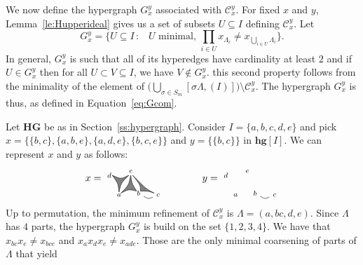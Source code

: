 \documentclass[ALCO,ThmDefs,Unicode,epreuves]{cedram}
\begin{document}
We now define the hypergraph $G_x^y$ associated with $\mathcal{C}_{x}^{y}$. For fixed $x$ and $y$, Lemma~\ref{le:Hupperideal} gives us a set of subsets $U\subseteq I$ defining $\mathcal{C}_{x}^{y}$. Let
 $$G_x^y=\{U\subseteq I \,:\,\text{ $U$ minimal, } \prod_{i\in U} x_{\Lambda_i} \ne x_{\bigcup_{i\in U} \Lambda_i}\} .$$
In general, $G_x^y$ is such that all of its hyperedges have cardinality at least $2$ and if $U\in G_x^y$ then for all $U\subset V\subseteq I$, we have $V\not\in G_x^y$. this second property follows from the minimality of the element of $\big(\bigcup_{\sigma\in S_m} [\sigma\Lambda,(I)]\big)\setminus \mathcal{C}_{x}^{y}$. The hypergraph $G_x^y$ is thus, as defined in Equation~\eqref{eq:Gcom}.





\begin{exam}\label{ex:hypergraph}
Let $\mathbf{HG}$ be as in Section~\ref{ss:hypergraph}. Consider $I= \{a,b,c,d,e\}$ and pick $x=\big\{\{b,c\},\{a,b,e\},\{a,d,e\},\{b,c,e\}\big\}$ and $y=\big\{
\{b,c\}\big\}$ in $\mathbf{hg}[I]$. We can represent $x$ and $y$ as follows:
$$
x=
\begin{tikzpicture}[scale=.7,baseline=.5cm]
	\node (a) at (0,0) {$\scriptstyle a$};
	\node (b) at (1,.1) {$\scriptstyle b$};
	\node (c) at (2,0) {$\scriptstyle c$};
	\node (d) at (-.5,1) {$\scriptstyle d$};
	\node (e) at (.6,1.2) {$\scriptstyle e$};
	\draw [fill=gray] (.1,.1) .. controls (.5,.3) .. (.9,.2) .. controls (.65,.6) .. (.6,1) .. controls (.5,.5) .. (.1,.1) ; 
	\draw [fill=gray] (0,.15) .. controls (-.05,.6) .. (-.35,1) .. controls (.1,.8) .. (.5,1) .. controls (.1,.6) .. (0,.15) ; 
	\draw [fill=gray] (1.8,.1) .. controls (1.5,.2) .. (1.1,.2) .. controls (1.1,.5) .. (.7,1) .. controls (1.4,.3) .. (1.8,.1) ; 
	\draw (b) .. controls (1.5,-.2) .. (c); 
\end{tikzpicture} 
\qquad \qquad
y=
\begin{tikzpicture}[scale=.7,baseline=.5cm]
	\node (a) at (0,0) {$\scriptstyle a$};
	\node (b) at (1,.1) {$\scriptstyle b$};
	\node (c) at (2,0) {$\scriptstyle c$};
	\node (d) at (-.5,1) {$\scriptstyle d$};
	\node (e) at (.6,1.2) {$\scriptstyle e$};
	\draw (b) .. controls (1.5,-.2) .. (c); 
\end{tikzpicture} 
$$
Up to permutation, the minimum refinement of $\mathcal{C}_x^y$
is $\Lambda=(a,bc,d,e)$. Since $\Lambda$ has $4$ parts, the hypergraph $G_x^y$ is build on the set $\{1,2,3,4\}$.
We have that $x_{bc}x_{e}\ne x_{bce}$ and $x_{a}x_dx_e\ne x_{ade}$. Those are the only minimal coarsening of parts of $\Lambda$ that yield

\end{exam}
\end{document}
